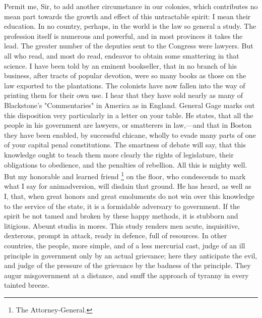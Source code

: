 Permit me, Sir, to add another circumstance in our colonies, which contributes no mean part towards the growth and effect of this untractable spirit: I mean their education. In no country, perhaps, in the world is the law so general a study. The profession itself is numerous and powerful, and in most provinces it takes the lead. The greater number of the deputies sent to the Congress were lawyers. But all who read, and most do read, endeavor to obtain some smattering in that science. I have been told by an eminent bookseller, that in no branch of his business, after tracts of popular devotion, were so many books as those on the law exported to the plantations. The colonists have now fallen into the way of printing them for their own use. I hear that they have sold nearly as many of Blackstone's "Commentaries" in America as in England. General Gage marks out this disposition very particularly in a letter on your table. He states, that all the people in his government are lawyers, or smatterers in law,—and that in Boston they have been enabled, by successful chicane, wholly to evade many parts of one of your capital penal constitutions. The smartness of debate will say, that this knowledge ought to teach them more clearly the rights of legislature, their obligations to obedience, and the penalties of rebellion. All this is mighty well. But my honorable and learned friend
\footnote{The Attorney-General.}
on the floor, who condescends to mark what I say for animadversion, will disdain that ground. He has heard, as well as I, that, when great honors and great emoluments do not win over this knowledge to the service of the state, it is a formidable adversary to government. If the spirit be not tamed and broken by these happy methods, it is stubborn and litigious. Abeunt studia in mores. This study renders men acute, inquisitive, dexterous, prompt in attack, ready in defence, full of resources. In other countries, the people, more simple, and of a less mercurial cast, judge of an ill principle in government only by an actual grievance; here they anticipate the evil, and judge of the pressure of the grievance by the badness of the principle. They augur misgovernment at a distance, and snuff the approach of tyranny in every tainted breeze.

